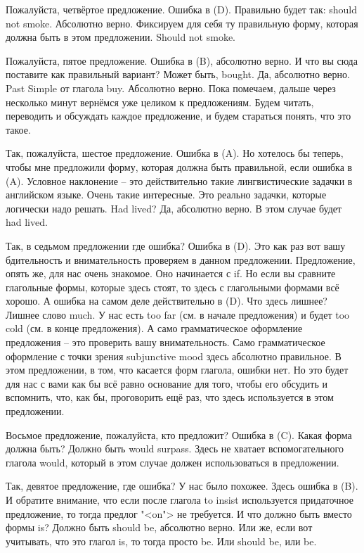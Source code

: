 \documentclass[main.tex]{subfiles}
\begin{document}
Пожалуйста, четвёртое предложение.
Ошибка в (D).
Правильно будет так: should not smoke.
Абсолютно верно.
Фиксируем для себя ту правильную форму, которая должна быть в этом предложении.
Should not smoke.

Пожалуйста, пятое предложение.
Ошибка в (B), абсолютно верно.
И что вы сюда поставите как правильный вариант?
Может быть, bought.
Да, абсолютно верно.
Past Simple от глагола buy.
Абсолютно верно.
Пока помечаем, дальше через несколько минут вернёмся уже целиком к предложениям.
Будем читать, переводить и обсуждать каждое предложение, и будем стараться понять, что это такое.

Так, пожалуйста, шестое предложение.
Ошибка в (A).
Но хотелось бы теперь, чтобы мне предложили форму, которая должна быть правильной, если ошибка в (A).
Условное наклонение -- это действительно такие лингвистические задачки в английском языке.
Очень такие интересные.
Это реально задачки, которые логически надо решать.
Had lived?
Да, абсолютно верно.
В этом случае будет had lived.

Так, в седьмом предложении где ошибка?
Ошибка в (D).
Это как раз вот вашу бдительность и внимательность проверяем в данном предложении.
Предложение, опять же, для нас очень знакомое.
Оно начинается с if.
Но если вы сравните глагольные формы, которые здесь стоят, то здесь с глагольными формами всё хорошо.
А ошибка на самом деле действительно в (D).
Что здесь лишнее?
Лишнее слово much.
У нас есть too far (см. в начале предложения) и будет too cold (см. в конце предложения).
А само грамматическое оформление предложения -- это проверить вашу внимательность.
Само грамматическое оформление с точки зрения subjunctive mood здесь абсолютно правильное.
В этом предложении, в том, что касается форм глагола, ошибки нет.
Но это будет для нас с вами как бы всё равно основание для того, чтобы его обсудить и вспомнить, что, как бы, проговорить ещё раз, что здесь используется в этом предложении.

Восьмое предложение, пожалуйста, кто предложит?
Ошибка в (C).
Какая форма должна быть?
Должно быть would surpass.
Здесь не хватает вспомогательного глагола would, который в этом случае должен использоваться в предложении.

Так, девятое предложение, где ошибка?
У нас было похожее.
Здесь ошибка в (B).
И обратите внимание, что если после глагола to insist используется придаточное предложение, то тогда предлог "<on"> не требуется.
И что должно быть вместо формы is?
Должно быть should be, абсолютно верно.
Или же, если вот учитывать, что это глагол is, то тогда просто be.
Или should be, или be.
\end{document}
